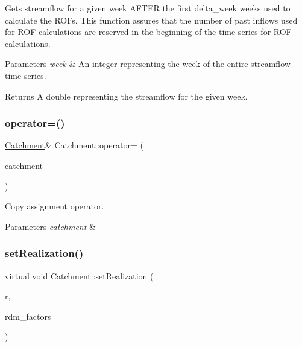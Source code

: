 Gets streamflow for a given week A\+F\+T\+ER the first delta\+\_\+week weeks used to calculate the R\+O\+Fs. This function assures that the number of past inflows used for R\+OF calculations are reserved in the beginning of the time series for R\+OF calculations. 


\begin{DoxyParams}{Parameters}
{\em week} & An integer representing the week of the entire streamflow time series. \\
\hline
\end{DoxyParams}
\begin{DoxyReturn}{Returns}
A double representing the streamflow for the given week. 
\end{DoxyReturn}
\mbox{\label{classCatchment_a5abab52eab9c05164f76e46954833989}} 
\subsubsection{\texorpdfstring{operator=()}{operator=()}}
{\footnotesize\ttfamily \mbox{\hyperlink{classCatchment}{Catchment}}\& Catchment\+::operator= (\begin{DoxyParamCaption}\item[{const \mbox{\hyperlink{classCatchment}{Catchment}} \&}]{catchment }\end{DoxyParamCaption})}



Copy assignment operator. 


\begin{DoxyParams}{Parameters}
{\em catchment} & \\
\hline
\end{DoxyParams}
\mbox{\label{classCatchment_ad76654af47dcd69bcb795c1c152409cc}} 
\subsubsection{\texorpdfstring{set\+Realization()}{setRealization()}}
{\footnotesize\ttfamily virtual void Catchment\+::set\+Realization (\begin{DoxyParamCaption}\item[{unsigned long}]{r,  }\item[{vector$<$ double $>$ \&}]{rdm\+\_\+factors }\end{DoxyParamCaption})\hspace{0.3cm}{\ttfamily [virtual]}}



